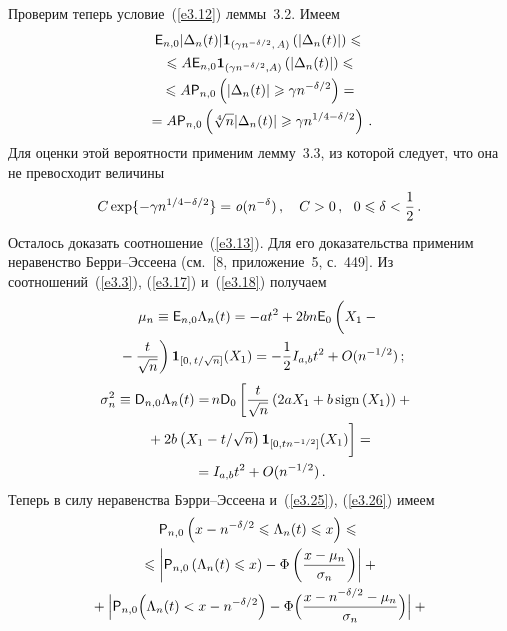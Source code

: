 \begin{multicols}{2}
Проверим теперь условие~(\ref{e3.12})  леммы~3.2. Имеем
\begin{multline*}
{{\sf E}}_{n,0} |\Delta_n(t)| {{\bf 1}_{(\gamma
n^{-\delta/2},\,A)}\left(|\Delta_n(t)|\right)}\leqslant{}\\
{}\leqslant
A {{\sf E}}_{n,0}{{\bf 1}_{(\gamma n^{-\delta/2}, A)}}\left( |\Delta_n(t)|
\right)\leqslant{}\\
{}
\leqslant A {{\sf P}}_{n,0}\left(|\Delta_n(t)| \geqslant \gamma n^{-\delta/2}
\right)={}\\
{}=
 A{{\sf P}}_{n,0}\left(\sqrt[{4}]{n}|\Delta_n(t)| \geqslant
\gamma n^{1/4 - \delta/2}\right)\,.
\end{multline*}
Для оценки этой вероятности применим лемму~3.3, из которой следует,
что она не превосходит вели\-чины
$$
C\exp\{-\gamma n^{1/4 - \delta/2}\} = {\it o}(n^{-\delta})\,, \quad
C > 0\,, \ \ 0 \leqslant \delta < \displaystyle\frac{\displaystyle 1\mathstrut}{\displaystyle 2\mathstrut}\,.
$$
Осталось доказать соотношение~(\ref{e3.13}). Для его доказательства
применим неравенство Берри--Эссеена (см.~[8, приложение~5, с.~449]. 
Из соотношений~(\ref{e3.3}), (\ref{e3.17}) и~(\ref{e3.18}) получаем
\begin{multline}
\mu_n \equiv {\e}_{n,0} \Lambda_n(t) = - at^2 + 2 b n
{\e}_0 \left(
\vphantom{\fr{t}{\sqrt{n}}}
X_1 -{}\right.\\
\!\left.{}-\fr{t}{\sqrt n}\right)
{\IT_{[0,\,t/\sqrt{n}]}(X_1)}  %
=
- \fr{1}{2}I_{a,b}t^2 + O(n^{-1/2})\,;\!\!
\label{e3.25}
\end{multline}
\begin{multline}
\!\!\sigma_n^2 \equiv {\D}_{n,0}\Lambda_n(t) =\hspace*{-1.1pt} %
n {\D}_0 \left[\fr{t}{\sqrt{n}}\left(2aX_1+ b\,
\mathrm{sign}\left(X_1\right)\right)+{}\right.\\
\left.{}+
2b\left(X_1 - t/\sqrt{n}\right)
{\IT_{[0,tn^{-1/2}]}(X_1)}
\vphantom{\fr{t}{\sqrt{n}}}
\right]={}\\
{}
= I_{a,b}t^2 + O(n^{-1/2})\,. 
\label{e3.26}
\end{multline}
Теперь в силу неравенства Бэрри--Эссеена и~(\ref{e3.25}), (\ref{e3.26}) имеем
\begin{multline}
{\p}_{n,0}\left(x - n^{-\delta/2} \le \Lambda_n(t) \le x\right)
\le{}\\
{}
\le \left |{\p}_{n,0}\left(\Lambda_n(t)\le  x\right) -
\Phi\left(\fr{x-\mu_n}{\sigma_n}\right)\right|+{}\\
{}
+ \Bigl|{\p}_{n,0}\Bigl(\Lambda_n(t) < x - n^{-\delta/2}\Bigr) -
\Phi\Bigl(\fr{x - n^{-\delta/2}-\mu_n}{\sigma_n}\Bigr)\Bigr|+{}\\

\end{multline}
\end{multicols}
